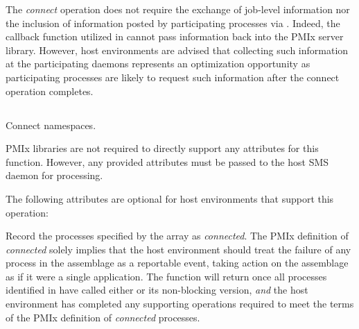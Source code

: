 \advicermstart
The \textit{connect} operation does not require the exchange of job-level information nor the inclusion of information posted by  participating processes via . Indeed, the callback function utilized in  cannot pass information back into the \ac{PMIx} server library. However, host environments are advised that collecting such information at the participating daemons represents an optimization opportunity as participating processes are likely to request such information after the connect operation completes.
\advicermend


\subsection{}

\summary

Connect namespaces.

\format


\begin{arglist}
\end{arglist}

\returnsimple

\reqattrstart
\ac{PMIx} libraries are not required to directly support any attributes for this function. However, any provided attributes must be passed to the host \ac{SMS} daemon for processing.

\reqattrend

\optattrstart
The following attributes are optional for host environments that support this operation:


\optattrend

\descr

Record the processes specified by the  array as \textit{connected}.  
The \ac{PMIx} definition of \textit{connected} solely implies that the host environment should treat the failure of any process in the assemblage as a reportable event, taking action on the assemblage as if it were a single application. 
The function will return once all processes identified in  have called either  or its non-blocking version, \textit{and} the host environment has completed any supporting operations required to meet the terms of the \ac{PMIx} definition of \textit{connected} processes.

